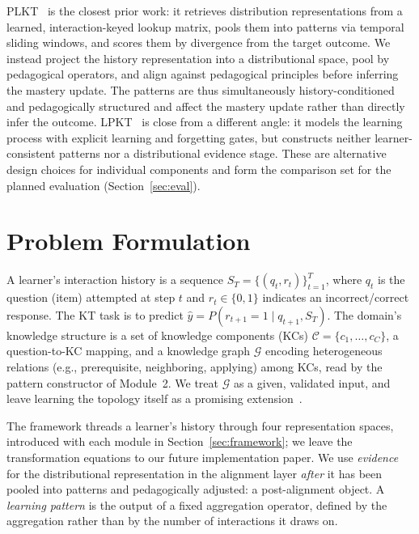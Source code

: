 \documentclass[conference]{IEEEtran}
\begin{document}
PLKT~\cite{wu2026plkt} is the closest prior work: it retrieves distribution representations from a learned, interaction-keyed lookup matrix, pools them into patterns via temporal sliding windows, and scores them by divergence from the target outcome. We instead project the history representation into a distributional space, pool by pedagogical operators, and align against pedagogical principles before inferring the mastery update. The patterns are thus simultaneously history-conditioned and pedagogically structured and affect the mastery update rather than directly infer the outcome. LPKT~\cite{shen2021lpkt} is close from a different angle: it models the learning process with explicit learning and forgetting gates, but constructs neither learner-consistent patterns nor a distributional evidence stage. These are alternative design choices for individual components and form the comparison set for the planned evaluation (Section~\ref{sec:eval}).

\section{Problem Formulation}
\label{sec:formulation}

A learner's interaction history is a sequence $S_T=\{(q_t,r_t)\}_{t=1}^{T}$, where $q_t$ is the question (item) attempted at step $t$ and $r_t \in \{0,1\}$ indicates an incorrect/correct response. The KT task is to predict $\hat{y}=P(r_{t+1}=1 \mid q_{t+1}, S_T)$. The domain's knowledge structure is a set of knowledge components (KCs) $\mathcal{C}=\{c_1,\dots,c_C\}$, a question-to-KC mapping, and a knowledge graph $\mathcal{G}$ encoding heterogeneous relations (e.g., prerequisite, neighboring, applying) among KCs, read by the pattern constructor of Module~2. We treat $\mathcal{G}$ as a given, validated input, and leave learning the topology itself as a promising extension~\cite{wu2026sskt}.

The framework threads a learner's history through four representation spaces, introduced with each module in Section~\ref{sec:framework}; we leave the transformation equations to our future implementation paper. We use \emph{evidence} for the distributional representation in the alignment layer \emph{after} it has been pooled into patterns and pedagogically adjusted: a post-alignment object. A \emph{learning pattern} is the output of a fixed aggregation operator, defined by the aggregation rather than by the number of interactions it draws on.
\end{document}
